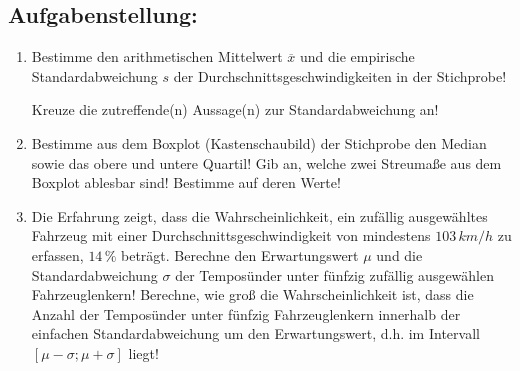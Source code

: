 \begin{langesbeispiel}
\subsection{Aufgabenstellung:}
\begin{enumerate}
	\item Bestimme den arithmetischen Mittelwert $\overline{x}$ und die empirische Standardabweichung $s$ der Durchschnittsgeschwindigkeiten in der Stichprobe!
	
	Kreuze die zutreffende(n) Aussage(n) zur Standardabweichung an!
	
		\item Bestimme aus dem Boxplot (Kastenschaubild) der Stichprobe den Median sowie das obere und untere Quartil! Gib an, welche zwei Streumaße aus dem Boxplot ablesbar sind! Bestimme auf deren Werte!
		\item Die Erfahrung zeigt, dass die Wahrscheinlichkeit, ein zufällig ausgewähltes Fahrzeug mit einer Durchschnittsgeschwindigkeit von mindestens $103\,km/h$ zu erfassen, $14\,\%$ beträgt. Berechne den Erwartungswert $\mu$ und die Standardabweichung $\sigma$ der Temposünder unter fünfzig zufällig ausgewählen Fahrzeuglenkern! Berechne, wie groß die Wahrscheinlichkeit ist, dass die Anzahl der Temposünder unter fünfzig Fahrzeuglenkern innerhalb der einfachen Standardabweichung um den Erwartungswert, d.h. im Intervall $[\mu-\sigma;\mu+\sigma]$ liegt!
\end{enumerate}

\end{langesbeispiel}
